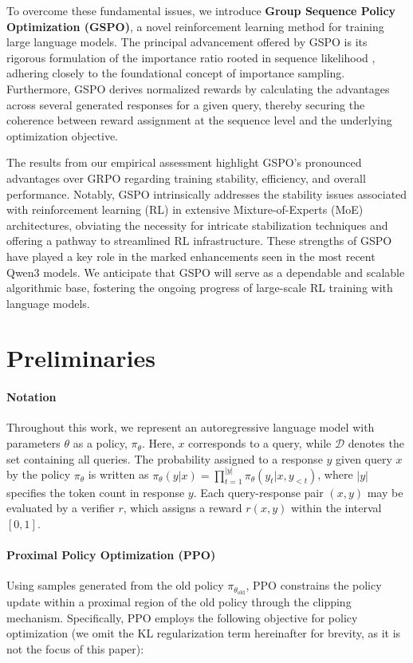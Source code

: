 To overcome these fundamental issues, we introduce \textbf{Group Sequence Policy Optimization (GSPO)}, a novel reinforcement learning method for training large language models. The principal advancement offered by GSPO is its rigorous formulation of the importance ratio rooted in sequence likelihood \citep{click}, adhering closely to the foundational concept of importance sampling. Furthermore, GSPO derives normalized rewards by calculating the advantages across several generated responses for a given query, thereby securing the coherence between reward assignment at the sequence level and the underlying optimization objective.

The results from our empirical assessment highlight GSPO's pronounced advantages over GRPO regarding training stability, efficiency, and overall performance. Notably, GSPO intrinsically addresses the stability issues associated with reinforcement learning (RL) in extensive Mixture-of-Experts (MoE) architectures, obviating the necessity for intricate stabilization techniques and offering a pathway to streamlined RL infrastructure. These strengths of GSPO have played a key role in the marked enhancements seen in the most recent Qwen3 models. We anticipate that GSPO will serve as a dependable and scalable algorithmic base, fostering the ongoing progress of large-scale RL training with language models.

\section{Preliminaries}

\paragraph{Notation}
Throughout this work, we represent an autoregressive language model with parameters $\theta$ as a policy, $\pi_\theta$. Here, $x$ corresponds to a query, while $\mathcal{D}$ denotes the set containing all queries. The probability assigned to a response $y$ given query $x$ by the policy $\pi_\theta$ is written as $\pi_\theta (y | x)=\prod_{t=1}^{|y|} \pi_\theta (y_t | x, y_{<t} )$, where $|y|$ specifies the token count in response $y$. Each query-response pair $(x, y)$ may be evaluated by a verifier $r$, which assigns a reward $r(x, y)$ within the interval $[0, 1]$.

\paragraph{Proximal Policy Optimization (PPO)} Using samples generated from the old policy $\pi_{\theta_\text{old}}$, PPO \citep{ppo} constrains the policy update within a proximal region of the old policy through the clipping mechanism. Specifically, PPO employs the following objective for policy optimization (we omit the KL regularization term hereinafter for brevity, as it is not the focus of this paper):

